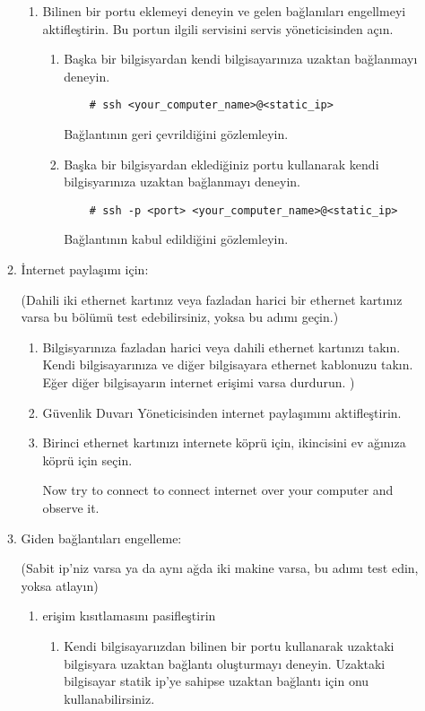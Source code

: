 \documentclass[a4paper,10pt]{article}
\begin{document}
\begin{enumerate}
\begin{enumerate}
\begin{enumerate}
        \item Bilinen bir portu eklemeyi deneyin ve gelen bağlanıları engellmeyi aktifleştirin.
            Bu portun ilgili servisini servis yöneticisinden açın.

        \begin{enumerate}
            \item Başka bir bilgisyardan kendi bilgisayarınıza uzaktan bağlanmayı deneyin.
	\begin{verbatim}
	# ssh <your_computer_name>@<static_ip>
	\end{verbatim}
	Bağlantının geri çevrildiğini gözlemleyin.

            \item Başka bir bilgisyardan eklediğiniz portu kullanarak kendi bilgisyarınıza uzaktan bağlanmayı deneyin.
	\begin{verbatim}
	# ssh -p <port> <your_computer_name>@<static_ip>
	\end{verbatim}
                 Bağlantının kabul edildiğini gözlemleyin.
        \end{enumerate}
    \end{enumerate}
    \item İnternet paylaşımı için: 

	(Dahili iki ethernet kartınız veya fazladan harici bir ethernet kartınız varsa bu bölümü test edebilirsiniz, yoksa bu adımı geçin.)
        \begin{enumerate}
        \item Bilgisyarınıza fazladan harici veya dahili ethernet kartınızı takın. Kendi bilgisayarınıza ve diğer bilgisayara ethernet kablonuzu takın. Eğer diğer bilgisayarın internet erişimi varsa durdurun. )

        \item Güvenlik Duvarı Yöneticisinden internet paylaşımını aktifleştirin.

        \item Birinci ethernet kartınızı internete köprü için, ikincisini ev ağınıza köprü için seçin.

              Now try to connect to connect internet over your computer and observe it.
        \end{enumerate}
    \item Giden bağlantıları engelleme:

	(Sabit ip'niz varsa ya da aynı ağda iki makine varsa, bu adımı test edin, yoksa atlayın)
        \begin{enumerate}
        \item erişim kısıtlamasını pasifleştirin
            \begin{enumerate}
            \item Kendi bilgisayarıızdan bilinen bir portu kullanarak uzaktaki bilgisyara uzaktan bağlantı oluşturmayı deneyin.
                Uzaktaki bilgisayar statik ip'ye sahipse uzaktan bağlantı için onu kullanabilirsiniz. 


\end{enumerate}
\end{enumerate}
\end{enumerate}
\end{enumerate}
\end{document}
